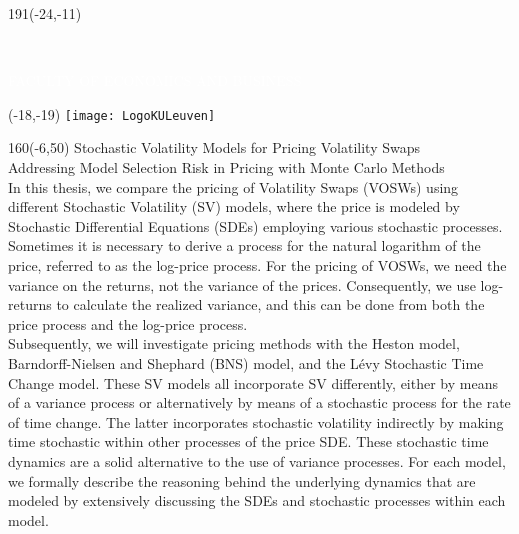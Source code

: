 \documentclass[12pt,a4paper,oneside]{report}
\makeatletter
\renewcommand{\@arrayparboxrestore}{\raggedright\normalfont}
\makeatother
\begin{document}
\thispagestyle{empty}


\setlength{\parindent}{0pt}
\makeatletter
\renewcommand{\@arrayparboxrestore}{\raggedright\normalfont}
\makeatother

\begin{textblock}{191}(-24,-11)
\colorbox{bluetitle}{\hspace{95mm}\ \parbox[c][18truemm]{94mm}{\textcolor{white}{FACULTY OF ECONOMICS AND BUSINESS}}}
\end{textblock}
%
\begin{textblock}{70}(-18,-19)
\textblockcolour{}
\texttt{[image: LogoKULeuven]}
\end{textblock}
%
\begin{textblock}{160}(-6,50)
\textblockcolour{}
\vspace{-\parskip}
\flushleft
\fontsize{40}{42}\selectfont \textcolor{bluetitle}{Stochastic Volatility Models for Pricing Volatility Swaps}\\[1.5mm]
\fontsize{20}{22}\selectfont Addressing Model Selection Risk in Pricing with Monte Carlo Methods\\[5.5mm]
\fontsize{10}{12}\selectfont \justify
In this thesis, we compare the pricing of Volatility Swaps (VOSWs) using different Stochastic Volatility (SV) models, where the price is modeled by Stochastic Differential Equations (SDEs) employing various stochastic processes. Sometimes it is necessary to derive a process for the natural logarithm of the price, referred to as the log-price process. For the pricing of VOSWs, we need the variance on the returns, not the variance of the prices. Consequently, we use log-returns to calculate the realized variance, and this can be done from both the price process and the log-price process. \\

Subsequently, we will investigate pricing methods with the Heston model, Barndorff-Nielsen and Shephard (BNS) model, and the Lévy Stochastic Time Change model. These SV models all incorporate SV differently, either by means of a variance process or alternatively by means of a stochastic process for the rate of time change. The latter incorporates stochastic volatility indirectly by making time stochastic within other processes of the price SDE. These stochastic time dynamics are a solid alternative to the use of variance processes. For each model, we formally describe the reasoning behind the underlying dynamics that are modeled by extensively discussing the SDEs and stochastic processes within each model. \\


\end{textblock}
\end{document}
